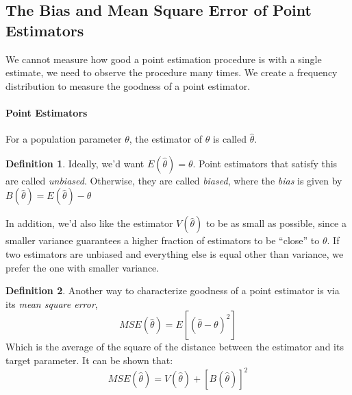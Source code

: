 \documentclass[12 pt]{article}
\theoremstyle{definition}
\newtheorem{defn}{Definition}
\begin{document}
        \subsection{The Bias and Mean Square Error of Point
          Estimators}
        We cannot measure how good a point estimation procedure is
        with a single estimate, we need to observe the procedure many
        times. We create a frequency distribution to measure the
        goodness of a point estimator.
        \paragraph{Point Estimators} For a population parameter
        $\theta$, the estimator of $\theta$ is called $\hat{\theta}$.
        \begin{defn}
        Ideally, we'd want $E(\hat{\theta}) = \theta$. Point
        estimators that satisfy this are called
        \textit{unbiased}. Otherwise, they are called \textit{biased},
        where the \textit{bias} is given by
        $B(\hat{\theta})=E(\hat{\theta})-\theta$
      \end{defn}
      In addition, we'd also like the estimator $V(\hat{\theta})$ to
      be as small as possible, since a smaller variance guarantees a
      higher fraction of estimators to be ``close'' to $\theta$. If
      two estimators are unbiased and everything else is equal other
      than variance, we prefer the one with smaller variance.
      \begin{defn}
        Another way to characterize goodness of a point estimator is
        via its \textit{mean square error},
        $$MSE(\hat{\theta}) = E[(\hat{\theta}-\theta)^2]$$
        Which is the average of the square of the distance between the
        estimator and its target parameter. It can be shown that:
        $$MSE(\hat{\theta})=V(\hat{\theta})+[B(\hat{\theta})]^2$$
      \end{defn}
\end{document}
